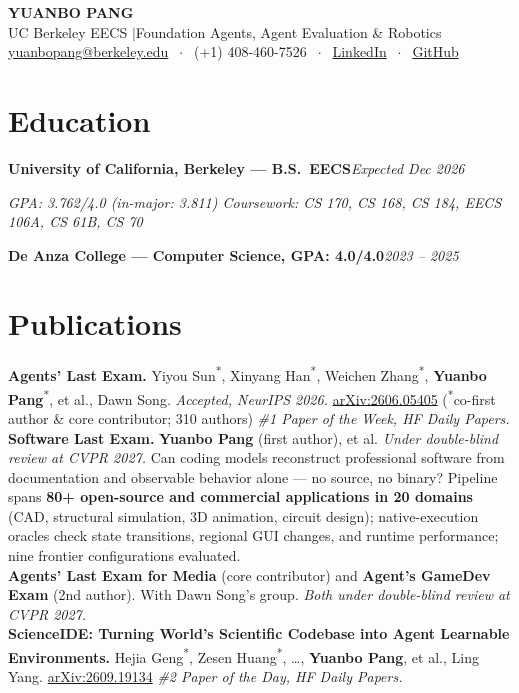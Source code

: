 \documentclass[9pt, letterpaper]{extarticle}
\newcommand{\role}[2]{%
  \vspace{2.5pt}%
  \noindent\textbf{#1}\hfill\textit{#2}\par\vspace{1pt}%
}
\newcommand{\rolesub}[1]{%
  \noindent\textit{#1}\par\vspace{1pt}%
}
\begin{document}
\begin{center}
  {\LARGE\bfseries YUANBO PANG}\\[2pt]
  {\large UC Berkeley EECS \quad$\vert$\quad Foundation Agents, Agent Evaluation \& Robotics}\\[2pt]
  \href{mailto:yuanbopang@berkeley.edu}{yuanbopang@berkeley.edu}
  $\;\cdot\;$ (+1) 408-460-7526
  $\;\cdot\;$ \href{https://www.linkedin.com/in/yuanbopang/}{LinkedIn}
  $\;\cdot\;$ \href{https://github.com/yuanboP}{GitHub}
\end{center}

\section{Education}
\role{University of California, Berkeley --- B.S.\ EECS}{Expected Dec 2026}
\rolesub{GPA: 3.762/4.0 (in-major: 3.811) \quad Coursework: CS 170, CS 168, CS 184, EECS 106A, CS 61B, CS 70}
\role{De Anza College --- Computer Science, GPA: 4.0/4.0}{2023 -- 2025}

\section{Publications}
\textbf{Agents' Last Exam.} Yiyou Sun\textsuperscript{*}, Xinyang Han\textsuperscript{*}, Weichen Zhang\textsuperscript{*}, \textbf{Yuanbo Pang}\textsuperscript{*}, et al., Dawn Song. \textit{Accepted, NeurIPS 2026.} \href{https://arxiv.org/abs/2606.05405}{arXiv:2606.05405} \quad(\textsuperscript{*}co-first author \& core contributor; 310 authors) \quad\textit{\#1 Paper of the Week, HF Daily Papers.}\\[2.5pt]
\textbf{Software Last Exam.} \textbf{Yuanbo Pang} (first author), et al. \textit{Under double-blind review at CVPR 2027.} Can coding models reconstruct professional software from documentation and observable behavior alone --- no source, no binary? Pipeline spans \textbf{80+ open-source and commercial applications in 20 domains} (CAD, structural simulation, 3D animation, circuit design); native-execution oracles check state transitions, regional GUI changes, and runtime performance; nine frontier configurations evaluated.\\[2.5pt]
\textbf{Agents' Last Exam for Media} (core contributor) and \textbf{Agent's GameDev Exam} (2nd author). With Dawn Song's group. \textit{Both under double-blind review at CVPR 2027.}\\[2.5pt]
\textbf{ScienceIDE: Turning World's Scientific Codebase into Agent Learnable Environments.} Hejia Geng\textsuperscript{*}, Zesen Huang\textsuperscript{*}, \ldots, \textbf{Yuanbo Pang}, et al., Ling Yang. \href{https://arxiv.org/abs/2609.19134}{arXiv:2609.19134} \quad\textit{\#2 Paper of the Day, HF Daily Papers.}
\end{document}
